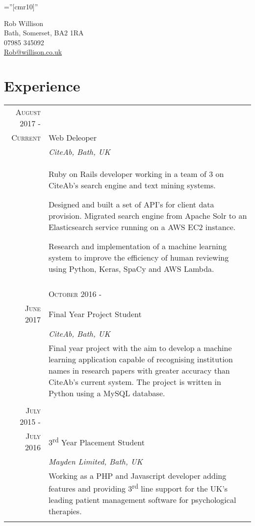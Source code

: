 \documentclass[a4paper,12pt]{article}
\begin{document}
\pagestyle{empty} %

\font\fb=''[cmr10]'' %


\par{\centering
		{\LARGE Rob Willison\\
		\small Bath, Somerset, BA2 1RA\\
		07985 345092\\
		\href{mailto:Rob@willison.co.uk}{Rob@willison.co.uk
	}\bigskip\par}

\section{Experience}
\begin{tabular}{rp{11cm}}
\textsc{August} 2017 -\\ \textsc{Current} & Web Deleoper
\\&\emph{CiteAb, Bath, UK}\\ &
\footnotesize{Ruby on Rails developer working in a team of 3 on CiteAb's search engine and
text mining systems.\par
Designed and built a set of API's for client data provision.
Migrated search engine from Apache Solr to an Elasticsearch service running on a AWS EC2 instance.\par
Research and implementation of a machine learning system to improve the efficiency of human reviewing using Python, Keras, SpaCy and AWS Lambda.
}\\\multicolumn{2}{c}{} \\ &

\textsc{October} 2016 -\\ \textsc{June} 2017 & Final Year Project Student
\\&\emph{CiteAb, Bath, UK}\\ &
\footnotesize{Final year project with the aim to develop a machine learning application capable of recognising institution names
 in research papers with greater accuracy than CiteAb's current system. The project is written in Python using a  MySQL database.}\\\multicolumn{2}{c}{} \\

\textsc{July} 2015 -\\ \textsc{July} 2016 & 3\textsuperscript{rd} Year Placement Student \\&\emph{Mayden Limited, Bath, UK}\\&\footnotesize{Working as a PHP and Javascript developer adding features and providing 3\textsuperscript{rd} line support for the UK's leading patient management software for psychological therapies.}\\\multicolumn{2}{c}{} \\
\end{tabular}

}
\end{document}
